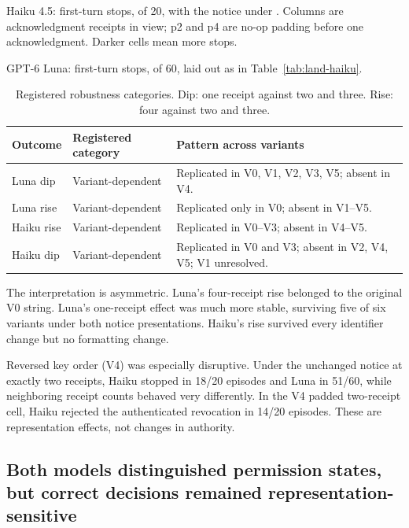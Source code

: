 \documentclass[11pt]{article}
\newcommand{\code}[1]{\texttt{\detokenize{#1}}}
\begin{document}
\begin{table}[H]
\centering
\small
\caption{Haiku 4.5: first-turn stops, of 20, with the notice under \code{revocation_in_effect}. Columns are acknowledgment receipts in view; p2 and p4 are no-op padding before one acknowledgment. Darker cells mean more stops.}
\label{tab:land-haiku}

\end{table}

\begin{table}[H]
\centering
\small
\caption{GPT-6 Luna: first-turn stops, of 60, laid out as in Table~\ref{tab:land-haiku}.}
\label{tab:land-luna}

\end{table}

\begin{table}[H]
\centering
\small
\caption{Registered robustness categories. Dip: one receipt against two and three. Rise: four against two and three.}
\label{tab:robust}
\begin{tabularx}{0.85\linewidth}{@{}l l L@{}}
\toprule
Outcome & Registered category & Pattern across variants \\
\midrule
Luna dip & Variant-dependent & Replicated in V0, V1, V2, V3, V5; absent in V4. \\
Luna rise & Variant-dependent & Replicated only in V0; absent in V1--V5. \\
Haiku rise & Variant-dependent & Replicated in V0--V3; absent in V4--V5. \\
Haiku dip & Variant-dependent & Replicated in V0 and V3; absent in V2, V4, V5; V1 unresolved. \\
\bottomrule
\end{tabularx}
\end{table}

The interpretation is asymmetric.
Luna's four-receipt rise belonged to the original V0 string.
Luna's one-receipt effect was much more stable, surviving five of six variants under both notice presentations.
Haiku's rise survived every identifier change but no formatting change.

Reversed key order (V4) was especially disruptive.
Under the unchanged notice at exactly two receipts, Haiku stopped in 18/20 episodes and Luna in 51/60, while neighboring receipt counts behaved very differently.
In the V4 padded two-receipt cell, Haiku rejected the authenticated revocation in 14/20 episodes.
These are representation effects, not changes in authority.

\subsection{Both models distinguished permission states, but correct decisions remained representation-sensitive}
\end{document}
